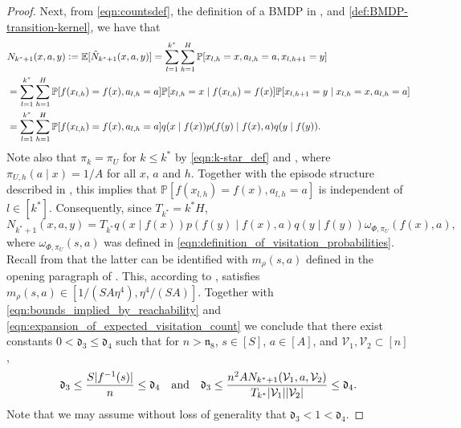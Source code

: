 \documentclass[11pt]{article}
\newcommand{\eqdef}{\vcentcolon=}
\newcommand{\mf}[1]{\mathfrak{#1}}
\newcommand{\mcV}{\mathcal{V}}
\newcommand{\mbbP}{\mathbb{P}}
\newcommand{\mbbE}{\mathbb{E}}
\theoremstyle{definition}
\theoremstyle{definition}
\begin{document}
\begin{proof}
	Next, from \eqref{eqn:countsdef}, the definition of a \gls{BMDP} in ,
	and \eqref{def:BMDP-transition-kernel}, we have that
	\begin{align}
		 &
		N_{k^*+1}(x,a,y)
		\eqdef
		\mbbE[\hat{N}_{k^*+1}(x,a,y)]
		=
		\sum_{l=1}^{k^*}
		\sum_{h=1}^H
		\mbbP[x_{l,h}=x,a_{l,h}=a,x_{l,h+1}=y]
		\nonumber
		\\
		 &
		=
		\sum_{l=1}^{k^*}
		\sum_{h=1}^H
		\mbbP[f(x_{l,h}) = f(x), a_{l,h}=a]
		\mbbP[x_{l,h} = x \mid f(x_{l,h}) = f(x)]
		\mbbP[x_{l,h+1}=y \mid x_{l,h}=x, a_{l,h}=a]
		\nonumber
		\\
		 &
		=
		\sum_{l=1}^{k^*}
		\sum_{h=1}^H
		\mbbP[f(x_{l,h}) = f(x), a_{l,h}=a]
		q(x\mid f(x))
		p(f(y)\mid f(x),a)
		q(y\mid f(y))
		.
		\label{eqn:expansion_of_expected_visitation_count}
	\end{align}
	Note also that $\pi_k = \pi_U$ for $k\leq k^*$ by \eqref{eqn:k-star_def} and , where $\pi_{U,h}(a\mid x)=1/A$ for all $x$, $a$ and $h$.
	Together with the episode structure described in , this implies that $\mbbP[f(x_{l,h}) = f(x), a_{l,h}=a]$ is independent of $l\in[k^*]$.
	Consequently, since $T_{k^*}=k^*H$,
	\begin{equation}
		\label{eqn:expansion_of_expected_visitation_count_simplified}
		N_{k^*+1}(x,a,y)
		=
		T_{k^*}
		q(x\mid f(x))
		p(f(y)\mid f(x),a)
		q(y\mid f(y))
		\omega_{\Phi,\pi_U}(f(x),a)
		,
	\end{equation}
	where $\omega_{\Phi,\pi_U}(s,a)$ was defined in \eqref{eqn:definition_of_visitation_probabilities}.
	Recall from  that the latter can be identified with $m_{\rho}(s,a)$ defined in the opening paragraph of \cite[Appendix D.3.3]{Jedra:2022}.
	This, according to \cite[Proposition 14]{Jedra:2022}, satisfies $m_{\rho}(s,a)\in [1/(SA\eta^4),\eta^4/(SA)]$.
	Together with \eqref{eqn:bounds_implied_by_reachability} and \eqref{eqn:expansion_of_expected_visitation_count} we conclude that there exist constants $0<\mf{d}_3\leq \mf{d}_4$ such that for $n> \mf{n}_8$, $s\in[S]$, $a\in[A]$, and $\mcV_1,\mcV_2\subset[n]$,
	\begin{equation}
		\label{eqn:cluster_size_bound}
		\mf{d}_3\leq \frac{S|f^{-1}(s)|}{n}\leq \mf{d}_4
		\quad\textnormal{and}\quad
		\mf{d}_3
		\leq
		\frac{n^2AN_{k^*+1}(\mcV_1,a,\mcV_2)}{T_{k^*}|\mcV_1||\mcV_2|}
		\leq
		\mf{d}_4
		.
	\end{equation}
	Note that we may assume without loss of generality that $\mf{d}_3<1<\mf{d}_4$.


\end{proof}
\end{document}
